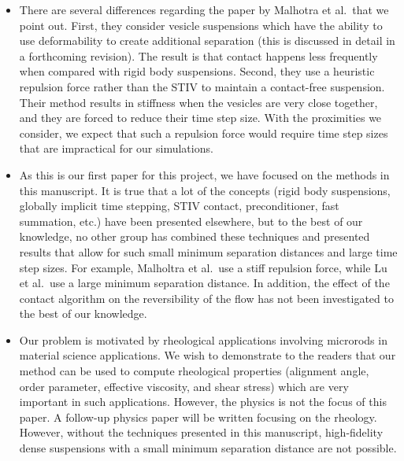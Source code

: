 \documentclass[11pt]{article}
\begin{document}
\begin{itemize}
  \item There are several differences regarding the paper by Malhotra et
    al.~that we point out.  First, they consider vesicle suspensions
    which have the ability to use deformability to create additional
    separation (this is discussed in detail in a forthcoming revision).
    The result is that contact happens less frequently when compared
    with rigid body suspensions.  Second, they use a heuristic repulsion
    force rather than the STIV to maintain a contact-free suspension.
    Their method results in stiffness when the vesicles are very close
    together, and they are forced to reduce their time step size.  With
    the proximities we consider, we expect that such a repulsion force
    would require time step sizes that are impractical for our
    simulations.

  \item As this is our first paper for this project, we have focused on
    the methods in this manuscript. It is true that a lot of the
    concepts (rigid body suspensions, globally implicit time stepping,
    STIV contact, preconditioner, fast summation, etc.) have been
    presented elsewhere, but to the best of our knowledge, no other
    group has combined these techniques and presented results that allow
    for such small minimum separation distances and large time step
    sizes.  For example, Malholtra et al.~use a stiff repulsion force,
    while Lu et al.~use a large minimum separation distance.  In
    addition, the effect of the contact algorithm on the reversibility
    of the flow has not been investigated to the best of our knowledge.

  \item Our problem is motivated by rheological applications involving
    microrods in material science applications.  We wish to demonstrate
    to the readers that our method can be used to compute rheological
    properties (alignment angle, order parameter, effective viscosity,
    and shear stress) which are very important in such applications.
    However, the physics is not the focus of this paper.  A follow-up
    physics paper will be written focusing on the rheology.  However,
    without the techniques presented in this manuscript, high-fidelity
    dense suspensions with a small minimum separation distance are not
    possible.
    
\end{itemize}
\end{document}
